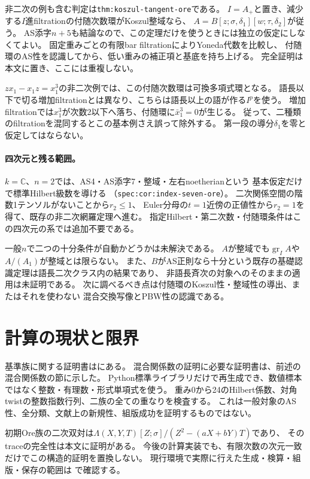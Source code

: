 \documentclass[11pt,a4paper]{ltjsarticle}
\begin{document}
非二次の例も含む判定は\texttt{thm:koszul-tangent-ore}である。
$I=A_+$と置き、減少する$I$進filtrationの付随次数環がKoszul整域なら、
$A=B[z;\sigma,\delta_1][w;\tau,\delta_2]$が従う。
AS添字$n+5$も結論なので、この定理だけを使うときには独立の仮定にしなくてよい。
固定重みごとの有限bar filtrationによりYoneda代数を比較し、
付随環のAS性を認識してから、低い重みの補正項と基底を持ち上げる。
完全証明は本文に置き、ここには重複しない。

$zx_1-x_1z=x_1^3$の非二次例では、この付随次数環は可換多項式環となる。
語長以下で切る増加filtrationとは異なり、こちらは語長以上の語が作る$I^p$を使う。
増加filtrationでは$x_1^3$が次数2以下へ落ち、付随環に$\bar x_1^3=0$が生じる。
従って、二種類のfiltrationを混同するとこの基本例さえ誤って除外する。
第一段の導分$\delta_1$を零と仮定してはならない。

\paragraph{四次元と残る範囲。}
$k=\mathbb C$、$n=2$では、AS4・AS添字7・整域・左右noetherianという
基本仮定だけで標準Hilbert級数を導ける
（\texttt{spec:cor:index-seven-ore}）。
二次関係空間の階数1テンソルがないことから$r_2\le1$、
Euler分母の$t=1$近傍の正値性から$r_2=1$を得て、既存の非二次網羅定理へ進む。
指定Hilbert・第二次数・付随環条件はこの四次元の系では追加不要である。

一般$n$で二つの十分条件が自動かどうかは未解決である。
$A$が整域でも$\operatorname{gr}_I A$や$A/(A_1)$が整域とは限らない。
また、$B$がAS正則なら十分という既存の基礎認識定理は語長二次クラス内の結果であり、
非語長斉次の対象へのそのままの適用は未証明である。
次に調べるべき点は付随環のKoszul性・整域性の導出、またはそれを使わない
混合交換写像とPBW性の認識である。

\section{計算の現状と限界}
基準族に関する証明書はにある。
混合関係数の証明に必要な証明書は、前述の混合関係数の節に示した。
Python標準ライブラリだけで再生成でき、数値標本ではなく整数・有理数・形式単項式を使う。
重み0から24のHilbert係数、対角twistの整数指数行列、二族の全ての重なりを検査する。
これは一般対象のAS性、全分類、文献上の新規性、組版成功を証明するものではない。

初期Ore族の二次双対は$\Lambda(X,Y,T)[Z;\sigma]/(Z^2-(aX+bY)T)$であり、
そのtraceの完全性は本文に証明がある。
今後の計算実装でも、有限次数の次元一致だけでこの構造的証明を置換しない。
現行環境で実際に行えた生成・検算・組版・保存の範囲は
で確認する。
\end{document}
